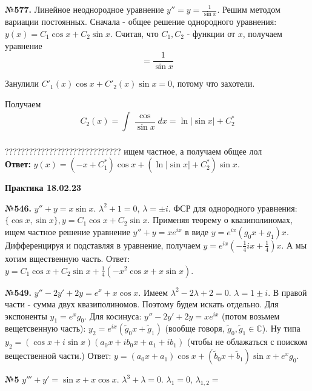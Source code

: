 \textbf{№577.} Линейное неоднородное уравнение $y'' = y = \frac{1}{\sin x}$. 
Решим методом вариации постоянных. Сначала - общее решение 
однородного уравнения: $y(x)= C_1\cos x + C_2 \sin x$. 
Считая, что $C_1,C_2$ - функции от $x$, получаем уравнение
$$ = \frac{1}{\sin x}$$ 


Занулили $C'_1(x)\cos x + C'_2(x)\sin x = 0$, потому что захотели.

Получаем 
$$C_2(x)=\int\limits_{}^{}\frac{\cos }{\sin x}dx = \ln|\sin x|+C^*_2$$


    ?????????????????????????????
ищем частное, а получаем общее лол\\
\textbf{Ответ:} $y(x) = (-x+C^*_1)\cos x + (\ln|\sin x| + C^*_2)\sin x$.

\textbf{Практика 18.02.23}

\textbf{№546.} $y''+y=x\sin x$. $\lambda^2 + 1 = 0$, 
$\lambda = \pm i$. ФСР для однородного уравнения:
$\{\cos x,\sin x\},y = C_1\cos x + C_2\sin x$. Применяя теорему о 
квазиполиномах, ищем частное решение уравнение $y''+y=xe^{ix}$ в виде 
$y = e^{ix}(g_0x+g_1)x$. Дифференцируя и подставляя в уравнение,  
получаем $y = e^{ix}(-\frac{1}{4}ix + \frac{1}{4})x$. А мы хотим вщественную 
часть. Ответ: $y = C_1\cos x + C_2\sin x +\frac{1}{4}(-x^2\cos x+x\sin x)$. 


\textbf{№549.} $y''-2y'+2y = e^x + x\cos x$. 
Имеем $\lambda^2-2\lambda + 2 = 0$. $\lambda = 1 \pm i$. 
В правой части - сумма двух квазиполиномов. Поэтому будем искать отдельно.
Для экспоненты $y_1=e^xg_0$. Для косинуса: $y''-2y'+2y = xe^{ix}$ (потом
возьмем вещетсвенную часть):  $y_2 = e^{ix}(\tilde g_0x+\tilde g_1)$ 
(вообще говоря, $\tilde g_0,\tilde g_1\in \mathbb{C}$). Ну типа
$y_2 = (\cos x +i\sin x)(a_0x+ib_0x+a_1+ib_1)$ (чтобы не облажаться с поиском
вещественной части.)
Ответ: $y=(a_0x+a_1)\cos x+(\tilde b_0x+\tilde b_1)\sin x + e^xg_0$. 

\textbf{№5} $y''' + y' = \sin x + x \cos x$. 
$\lambda^3+\lambda =0$.
$\lambda_1=0$, $\lambda_{1,2} = $








